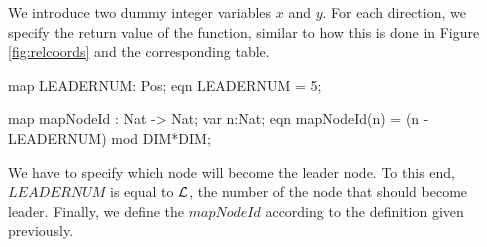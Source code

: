 We introduce two dummy integer variables $x$ and $y$. For each direction, we specify the return value of the function, similar to how this is done in Figure \ref{fig:relcoords} and the corresponding table.

\begin{codeverb}
map     LEADERNUM: Pos;
eqn     LEADERNUM = 5;

map     mapNodeId : Nat -> Nat;
var     n:Nat;
eqn     mapNodeId(n) = (n - LEADERNUM) mod DIM*DIM;
\end{codeverb}

We have to specify which node will become the leader node. To this end, $LEADERNUM$ is equal to $\mathcal{L}$, the number of the node that should become leader. Finally, we define the $mapNodeId$ according to the definition given previously.
